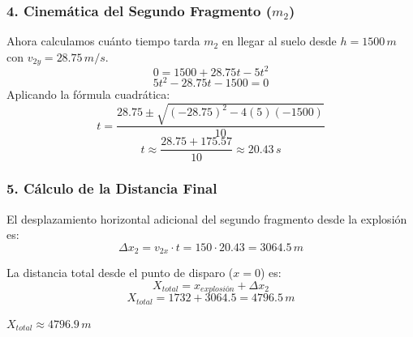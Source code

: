 \documentclass[12pt, a4paper]{article}
\begin{document}
\subsubsection*{4. Cinemática del Segundo Fragmento ($m_2$)}
Ahora calculamos cuánto tiempo tarda $m_2$ en llegar al suelo desde $h=1500 \, \si{m}$ con $v_{2y} = 28.75 \, \si{m/s}$.
\[ 0 = 1500 + 28.75 t - 5 t^2 \]
\[ 5t^2 - 28.75t - 1500 = 0 \]
Aplicando la fórmula cuadrática:
\[ t = \frac{28.75 \pm \sqrt{(-28.75)^2 - 4(5)(-1500)}}{10} \]
\[ t \approx \frac{28.75 + 175.57}{10} \approx 20.43 \, \si{s} \]

\subsubsection*{5. Cálculo de la Distancia Final}
El desplazamiento horizontal adicional del segundo fragmento desde la explosión es:
\[ \Delta x_2 = v_{2x} \cdot t = 150 \cdot 20.43 = 3064.5 \, \si{m} \]

La distancia total desde el punto de disparo ($x=0$) es:
\[ X_{total} = x_{explosión} + \Delta x_2 \]
\[ X_{total} = 1732 + 3064.5 = 4796.5 \, \si{m} \]

\begin{tcolorbox}[colback=green!5!white, colframe=green!50!black, title=Respuesta Final]
\centering \Large $X_{total} \approx 4796.9 \, \si{m}$
\end{tcolorbox}
\end{document}
